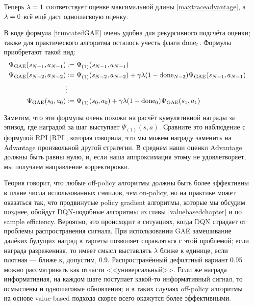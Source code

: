 Теперь $\lambda \HM= 1$ соответствует оценке максимальной длины \eqref{maxtraceadvantage}, а $\lambda \HM= 0$ всё ещё даст одношагвоую оценку.

В коде формула \eqref{truncatedGAE} очень удобна для рекурсивного подсчёта оценки; также для практического алгоритма осталось учесть флаги $\mathrm{done}_t$. Формулы приобретают такой вид:
\begin{equation*}
\begin{split}
\Psi_{\mathrm{GAE}}(s_{N-1}, a_{N-1}) &\coloneqq \Psi_{(1)}(s_{N-1}, a_{N-1}) \\
\Psi_{\mathrm{GAE}}(s_{N-2}, a_{N-2}) &\coloneqq \Psi_{(1)}(s_{N-2}, a_{N-2}) + \gamma \lambda (1 - \mathrm{done}_{N-2}) \Psi_{\mathrm{GAE}}(s_{N-1}, a_{N-1}) \\
&\vdots \\
\Psi_{\mathrm{GAE}}(s_0, a_0) &\coloneqq \Psi_{(1)}(s_0, a_0) + \gamma \lambda (1 - \mathrm{done}_0) \Psi_{\mathrm{GAE}}(s_1, a_1)
\end{split}
\end{equation*}

Заметим, что эти формулы очень похожи на расчёт кумулятивной награды за эпизод, где наградой за шаг выступает $\Psi_{(1)}(s, a)$. Сравните это наблюдение с формулой RPI \eqref{RPI}, которая говорила, что мы можем награду заменить на Advantage произвольной другой стратегии. В среднем наши оценки Advantage должны быть равны нулю, и, если наша аппроксимация этому не удовлетворяет, мы получаем направление корректировки.

\begin{remark}
Теория говорит, что любые off-policy алгоритмы должны быть более эффективны в плане числа использованных сэмплов, чем on-policy, но на практике может оказаться так, что продвинутые policy gradient алгоритмы, которые мы обсудим позднее, обойдут DQN-подобные алгоритмы из главы \ref{valuebasedchapter} и по sample efficiency. Вероятно, это происходит в ситуациях, когда DQN страдает от проблемы распространения сигнала. При использовании GAE замешивание далёких будущих наград в таргеты позволяет справляться с этой проблемой; если награда разреженная, то имеет смысл выставлять $\lambda$ ближе к единице, если плотная --- ближе к, допустим, 0.9. Распространённый дефолтный вариант 0.95 можно рассматривать как отчасти <<универсальный>>. Если же награда информативная, на каждом шаге поступает какой-то информативный сигнал, то осмыслены и одношаговые обновления; и в таких случаях off-policy алгоритмы на основе value-based подхода скорее всего окажутся более эффективными.
\end{remark}

